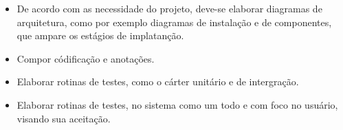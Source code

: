 \begin{itemize}
  \item De acordo com as necessidade do projeto, deve-se elaborar diagramas de
  arquitetura, como por exemplo diagramas de instalação e de componentes, que
  ampare os estágios de implatanção.
  \item Compor códificação e anotações.
  \item Elaborar rotinas de testes, como o cárter unitário e de intergração.
  \item Elaborar rotinas de testes, no sistema como um todo e com foco no
  usuário, visando sua aceitação.
\end{itemize} 


